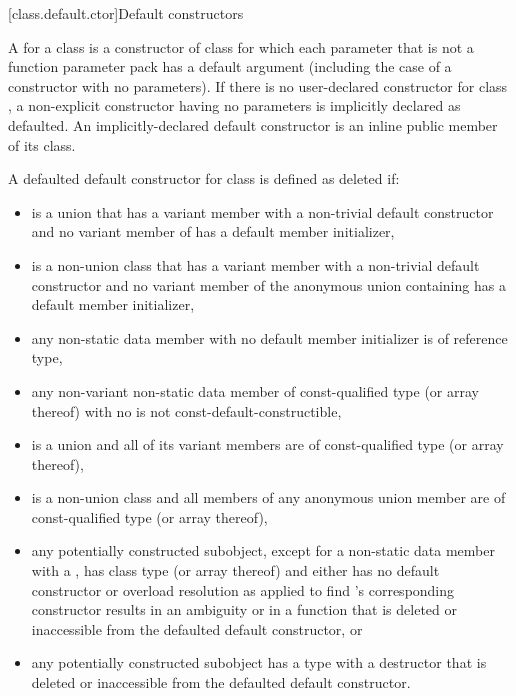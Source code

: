 [class.default.ctor]{Default constructors}

\pnum
{}%
%
A  for a class 
is a constructor of class 
for which each parameter
that is not a function parameter pack
has a default argument
(including the case of a constructor with no parameters).
%
If there is no user-declared constructor for class
,
a non-explicit constructor having no parameters is implicitly declared
as defaulted.
An implicitly-declared default constructor is an
inline public member of its class.

\pnum
A defaulted default constructor for class  is defined as deleted if:
\begin{itemize}
\item {} is a union that has a variant member
with a non-trivial default constructor and
no variant member of  has a default member initializer,

\item {} is a non-union class that has a variant member 
with a non-trivial default constructor and
no variant member of the anonymous union containing 
has a default member initializer,

\item any non-static data member with no default member initializer is
of reference type,

\item any non-variant non-static data member of const-qualified type (or array
thereof) with no 
is not const-default-constructible,

\item {} is a union and all of its variant members are of const-qualified
type (or array thereof),

\item {} is a non-union class and all members of any anonymous union member are
of const-qualified type (or array thereof),

\item any potentially constructed subobject, except for a non-static data member
with a , has
class type  (or array thereof) and either 
has no default constructor or overload resolution
as applied to find 's corresponding
constructor results in an ambiguity or in a function that is deleted or
inaccessible from the defaulted default constructor, or

\item any potentially constructed subobject has a type
with a destructor that is deleted or inaccessible from the defaulted default
constructor.
\end{itemize}

